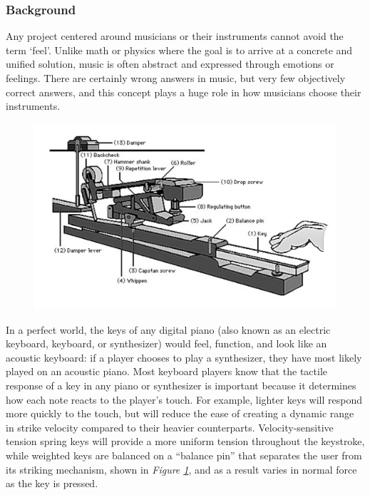 \subsubsection{Background}

Any project centered around musicians or their instruments cannot avoid the term ‘feel’. Unlike math or physics where the goal is to arrive at a concrete and unified solution, music is often abstract and expressed through emotions or feelings. There are certainly wrong answers in music, but very few objectively correct answers, and this concept plays a huge role in how musicians choose their instruments.

\begin{figure}[h!]
  \centering
  \includegraphics[width=\linewidth]{image/KeyMechanism.png}
  \caption{}
  \label{fig:key_mechanism}
\end{figure}

In a perfect world, the keys of any digital piano (also known as an electric keyboard, keyboard, or synthesizer) would feel, function, and look like an acoustic keyboard: if a player chooses to play a synthesizer, they have most likely played on an acoustic piano. Most keyboard players know that the tactile response of a key in any piano or synthesizer is important because it determines how each note reacts to the player’s touch. For example, lighter keys will respond more quickly to the touch, but will reduce the ease of creating a dynamic range in strike velocity compared to their heavier counterparts. Velocity-sensitive tension spring keys will provide a more uniform tension throughout the keystroke, while weighted keys are balanced on a “balance pin” that separates the user from its striking mechanism, shown in \textit{Figure \ref{fig:key_mechanism}}, and as a result varies in normal force as the key is pressed.

